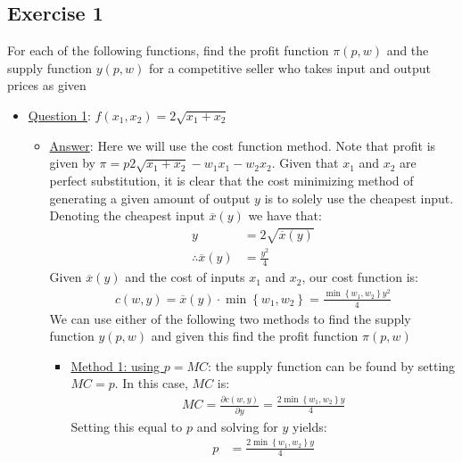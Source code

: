 \documentclass{article}
\begin{document}
\subsection{Exercise 1}
For each of the following functions, find the profit function $\pi(p,w)$ and the supply function $y(p,w)$ for a competitive seller who takes input and output prices as given \par \vspace{0.3em}
  \begin{itemize}
    \item  \underline{Question 1}: $f(x_{1}, x_{2}) = 2 \sqrt{x_{1}+x_{2}}$
    \begin{itemize}
      \item  \underline{Answer}: Here we will use the cost function method. Note that profit is given by $\pi = p2 \sqrt{x_{1} + x_{2}} - w_{1}x_{1} - w_{2}x_{2}$. Given that $x_{1}$ and $x_{2}$ are perfect substitution, it is clear that the cost minimizing method of generating a given amount of output $y$ is to solely use the cheapest input. Denoting the cheapest input $\overline{x}(y)$ we have that:
      \begin{align*}
        y &= 2 \sqrt{\overline{x}(y)} \\
        \therefore \overline{x}(y) &= \frac{y^{2}}{4}
      \end{align*}
      Given $\overline{x}(y)$ and the cost of inputs $x_{1}$ and $x_{2}$, our cost function is:
      \begin{gather*}
        c(w,y) = \overline{x}(y) \cdot \min \left\{ w_{1}, w_{2} \right\} = \frac{\min \left\{ w_{1}, w_{2} \right\} y^{2}}{4}
      \end{gather*}
      We can use either of the following two methods to find the supply function $y(p,w)$ and given this find the profit function $\pi (p,w)$ \\
      \begin{itemize}
        \item  \underline{Method 1: using $p = MC$}: the supply function can be found by setting $MC = p$. In this case, $MC$ is:
        \begin{gather*}
          MC = \frac{\partial c(w,y)}{\partial y} = \frac{2 \min \left\{ w_{1}, w_{2} \right\} y}{4}
        \end{gather*}
        Setting this equal to $p$ and solving for $y$ yields:
        \begin{align*}
          p &= \frac{2 \min \left\{ w_{1}, w_{2} \right\} y}{4} \\

\end{align*}
\end{itemize}
\end{itemize}
\end{itemize}
\end{document}
